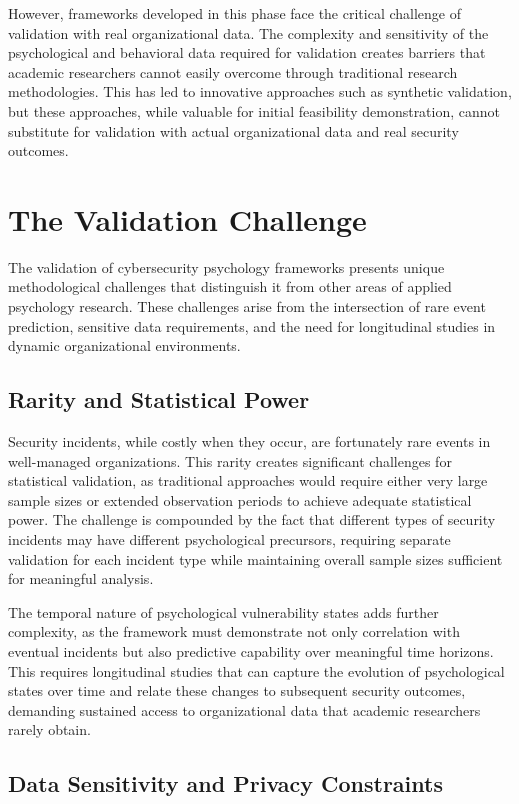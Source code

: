 \documentclass[10pt,twocolumn]{IEEEtran}
\begin{document}
However, frameworks developed in this phase face the critical challenge of validation with real organizational data. The complexity and sensitivity of the psychological and behavioral data required for validation creates barriers that academic researchers cannot easily overcome through traditional research methodologies. This has led to innovative approaches such as synthetic validation, but these approaches, while valuable for initial feasibility demonstration, cannot substitute for validation with actual organizational data and real security outcomes.

\section{The Validation Challenge}

The validation of cybersecurity psychology frameworks presents unique methodological challenges that distinguish it from other areas of applied psychology research. These challenges arise from the intersection of rare event prediction, sensitive data requirements, and the need for longitudinal studies in dynamic organizational environments.

\subsection{Rarity and Statistical Power}

Security incidents, while costly when they occur, are fortunately rare events in well-managed organizations. This rarity creates significant challenges for statistical validation, as traditional approaches would require either very large sample sizes or extended observation periods to achieve adequate statistical power. The challenge is compounded by the fact that different types of security incidents may have different psychological precursors, requiring separate validation for each incident type while maintaining overall sample sizes sufficient for meaningful analysis.

The temporal nature of psychological vulnerability states adds further complexity, as the framework must demonstrate not only correlation with eventual incidents but also predictive capability over meaningful time horizons. This requires longitudinal studies that can capture the evolution of psychological states over time and relate these changes to subsequent security outcomes, demanding sustained access to organizational data that academic researchers rarely obtain.

\subsection{Data Sensitivity and Privacy Constraints}
\end{document}
